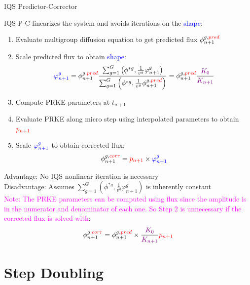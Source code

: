 \documentclass[8pt]{beamer}
\newcommand{\ben}{\begin{enumerate}}
\newcommand{\een}{\end{enumerate}}
\newcommand{\tcr}[1]{\textcolor{red}{#1}}
\newcommand{\tcb}[1]{\textcolor{blue}{#1}}
\newcommand{\tcm}[1]{\textcolor{magenta}{#1}}
\newcommand{\tcp}[1]{\textcolor{violet}{#1}}
\begin{document}
\begin{frame}{IQS Predictor-Corrector}

IQS P-C linearizes the system and avoids iterations on the \tcb{shape}: 
\ben
\item Evaluate multigroup diffusion equation to get predicted flux $\phi_{n+1}^{g,\tcr{pred}}$
\item Scale predicted flux to obtain \tcb{shape}:
\[
\tcb{\varphi^{g}_{n+1}} = \phi_{n+1}^{g,\tcr{pred}} \frac{\sum_{g=1}^G\left(\phi^{*g},\frac{1}{v^g}\varphi^g_{n+1}\right)}{\sum_{g=1}^G \left(\phi^{*g},\frac{1}{v^g}\phi_{n+1}^{g,\tcr{pred}}\right)} = \phi_{n+1}^{g,\tcr{pred}} \frac{\tcp{K_0}}{\tcp{K_{n+1}}}
\]
\item Compute PRKE parameters at $t_{n+1}$
\item Evaluate PRKE along micro step using interpolated parameters to obtain $\tcr{p_{n+1}}$
\item Scale $\tcb{\varphi^{g}_{n+1}}$ to obtain corrected flux:
\[
\phi_{n+1}^{g,\tcr{corr}} = \tcr{p_{n+1}} \times \tcb{\varphi^{g}_{n+1}}
\]
\een

 Advantage: No IQS nonlinear iteration is necessary \\
 Disadvantage: Assumes $\sum_{g=1}^G\left(\phi^{*g},\frac{1}{v^g}\varphi^g_{n+1}\right)$ is inherently constant \\
\vspace{2mm}
\small \tcm{Note: The PRKE parameters can be computed using flux since the amplitude is in the numerator and denominator of each one. So Step 2 is unnecessary if the corrected flux is solved with}:
\[
\phi_{n+1}^{g,\tcr{corr}} = \phi_{n+1}^{g,\tcr{pred}} \times \frac{\tcp{K_0}}{\tcp{K_{n+1}}} \tcr{p_{n+1}}
\]
\normalsize

\end{frame}

\section{Step Doubling}
\end{document}
